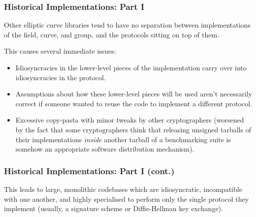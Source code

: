 \documentclass[xetex,aspectratio=169]{beamer}
\begin{document}
  \begin{frame}
    \frametitle{Historical Implementations: Part I}

    Other elliptic curve libraries tend to have no separation between
    implementations of the field, curve, and group, and the protocols sitting on
    top of them.

    \pause This causes several immediate issues:

    {\small
    \begin{itemize}
      \item<3-> Idiosyncracies in the lower-level pieces of the implementation
        carry over into idiosyncracies in the protocol.
      \item<4-> Assumptions about how these lower-level pieces will be used
        aren't necessarily correct if someone wanted to reuse the code to
        implement a different protocol.
      \item<5-> Excessive copy-pasta with minor tweaks by other cryptographers
        (worsened by the fact that some cryptographers think that
        releasing unsigned tarballs of their implementations \emph{inside} another
        tarball of a benchmarking suite is somehow an appropriate software
        distribution mechanism).
    \end{itemize}
    }
  \end{frame}


  \begin{frame}
    \frametitle{Historical Implementations: Part I (cont.)}

    This leads to large, monolithic codebases which are idiosyncratic,
    incompatible with one another, and highly specialised to perform only the
    single protocol they implement (usually, a signature scheme or
    Diffie-Hellman key exchange).

  \end{frame}
\end{document}
